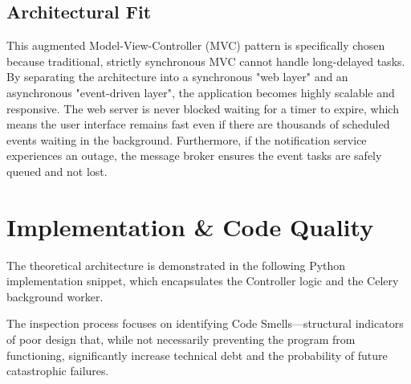 \subsection{Architectural Fit} This augmented Model-View-Controller (MVC) pattern is specifically chosen because traditional, strictly synchronous MVC cannot handle long-delayed tasks. By separating the architecture into a synchronous "web layer" and an asynchronous "event-driven layer", the application becomes highly scalable and responsive. The web server is never blocked waiting for a timer to expire, which means the user interface remains fast even if there are thousands of scheduled events waiting in the background. Furthermore, if the notification service experiences an outage, the message broker ensures the event tasks are safely queued and not lost.
\section{Implementation \& Code Quality}
The theoretical architecture is demonstrated in the following Python implementation snippet, which encapsulates the Controller logic and the Celery background worker.


The inspection process focuses on identifying Code Smells—structural indicators of poor design that, while not necessarily preventing the program from functioning, significantly increase technical debt and the probability of future catastrophic failures.

